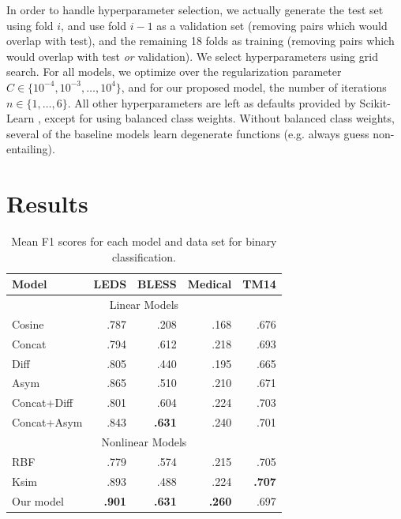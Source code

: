 In order to handle hyperparameter selection, we actually generate the test set
using fold $i$, and use fold $i-1$ as a validation set (removing pairs which
would overlap with test), and the remaining 18 folds as training (removing
pairs which would overlap with test {\em or} validation). We select
hyperparameters using grid search. For all models, we optimize over the regularization parameter
$C \in \{10^{-4}, 10^{-3}, \ldots, 10^4\}$, and for our proposed model, the
number of iterations $n \in \{1, \ldots, 6\}$. All other hyperparameters
are left as defaults provided by Scikit-Learn \cite{pedregosa:2013:jmlr},
except for using balanced class weights. Without balanced class weights,
several of the baseline models learn degenerate functions (e.g. always guess
non-entailing).

\section{Results}

\begin{table}
\centering
\begin{tabular}{|l|rrrr|}
  \hline
  {\bf Model}      & {\bf LEDS}  & {\bf BLESS} & {\bf Medical} & {\bf TM14}  \\
  \hline
  \hline
  \multicolumn{5}{|c|}{Linear Models}\\
  \hline
  Cosine           &      .787   &      .208   &      .168     &      .676   \\
  Concat           &      .794   &      .612   &      .218     &      .693   \\
  Diff             &      .805   &      .440   &      .195     &      .665   \\
  Asym             &      .865   &      .510   &      .210     &      .671   \\
  Concat+Diff      &      .801   &      .604   &      .224     &      .703   \\
  Concat+Asym      &      .843   &  {\bf.631}  &      .240     &      .701   \\
  \hline
  \multicolumn{5}{|c|}{Nonlinear Models}\\
  \hline
  RBF              &      .779   &      .574   &      .215     &      .705   \\
  Ksim             &      .893   &      .488   &      .224     &  {\bf.707}  \\
  Our model        &  {\bf.901}  &  {\bf.631}  &  {\bf.260}    &      .697   \\
  \hline
\end{tabular}
\caption{Mean F1 scores for each model and data set for binary classification.}
\label{tab:results}
\end{table}


